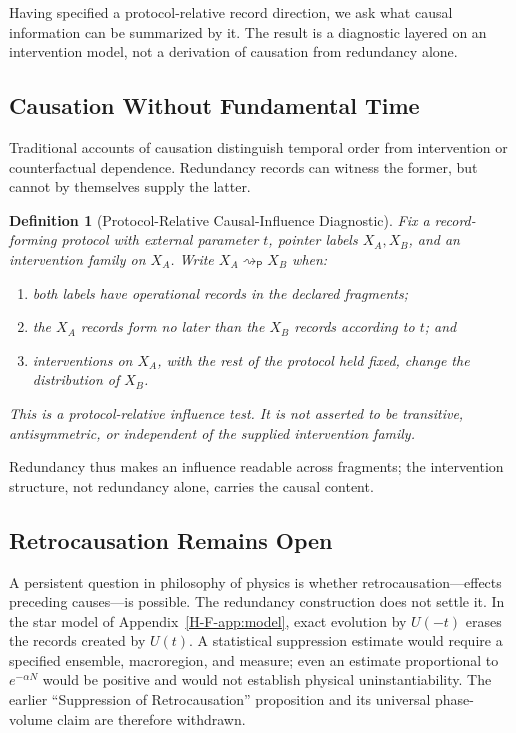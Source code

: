 \documentclass[12pt,a4paper,openany]{book}
\newtheorem{definition}[theorem]{Definition}
\begin{document}
Having specified a protocol-relative record direction, we ask what causal information can be summarized by it.  The result is a diagnostic layered on an intervention model, not a derivation of causation from redundancy alone.

\subsection{Causation Without Fundamental Time}

Traditional accounts of causation distinguish temporal order from intervention or counterfactual dependence.  Redundancy records can witness the former, but cannot by themselves supply the latter.

\begin{definition}[Protocol-Relative Causal-Influence Diagnostic]
\label{H-F-def:causal}
Fix a record-forming protocol with external parameter $t$, pointer labels $X_A,X_B$, and an intervention family on $X_A$.  Write $X_A\rightsquigarrow_{\mathsf P}X_B$ when:
\begin{enumerate}
    \item both labels have operational records in the declared fragments;
    \item the $X_A$ records form no later than the $X_B$ records according to $t$; and
    \item interventions on $X_A$, with the rest of the protocol held fixed, change the distribution of $X_B$.
\end{enumerate}
This is a protocol-relative influence test.  It is not asserted to be transitive, antisymmetric, or independent of the supplied intervention family.
\end{definition}

Redundancy thus makes an influence readable across fragments; the intervention structure, not redundancy alone, carries the causal content.

\subsection{Retrocausation Remains Open}

A persistent question in philosophy of physics is whether retrocausation---effects preceding causes---is possible.  The redundancy construction does not settle it.  In the star model of Appendix~\ref{H-F-app:model}, exact evolution by $U(-t)$ erases the records created by $U(t)$.  A statistical suppression estimate would require a specified ensemble, macroregion, and measure; even an estimate proportional to $e^{-\alpha N}$ would be positive and would not establish physical uninstantiability.  The earlier ``Suppression of Retrocausation'' proposition and its universal phase-volume claim are therefore withdrawn.
\end{document}
